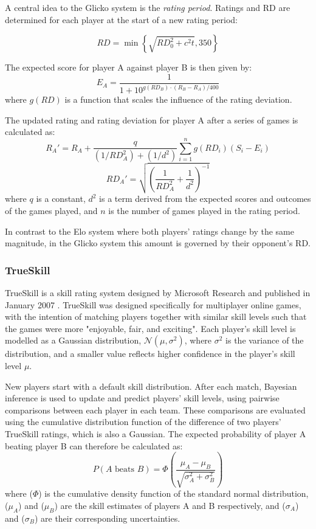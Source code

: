 A central idea to the Glicko system is the \textit{rating period}. Ratings and RD are determined for each player at the start of a new rating period:

\[
RD = \min \left\{ \sqrt{RD_0^2 + c^2t}, 350 \right\}
\]

The expected score for player A against player B is then given by:
\[
E_A = \frac{1}{1 + 10^{g(RD_B) \cdot (R_B - R_A) / 400}}
\]
where \( g(RD) \) is a function that scales the influence of the rating deviation.

The updated rating and rating deviation for player A after a series of games is calculated as:
\[
R_A' = R_A + \frac{q}{(1/RD_A^2) + (1/d^2)} \sum_{i=1}^{n} g(RD_i)(S_i - E_i)
\]
\[
RD_A' = \sqrt{\left(\frac{1}{RD_A^2} + \frac{1}{d^2}\right)^{-1}}
\]
where \( q \) is a constant, \( d^2 \) is a term derived from the expected scores and outcomes of the games played, and \( n \) is the number of games played in the rating period.

In contrast to the Elo system where both players' ratings change by the same magnitude, in the Glicko system this amount is governed by their opponent's RD.

\subsubsection{TrueSkill\texttrademark}

TrueSkill\texttrademark{} is a skill rating system designed by Microsoft Research and published in January 2007 \cite{trueskill}. TrueSkill was designed specifically for multiplayer online games, with the intention of matching players together with similar skill levels such that the games were more "enjoyable, fair, and exciting". Each player's skill level is modelled as a Gaussian distribution, $\mathcal{N}(\mu, \sigma^2)$, where $\sigma^2$ is the variance of the distribution, and a smaller value reflects higher confidence in the player's skill level $\mu$.

New players start with a default skill distribution. After each match, Bayesian inference is used to update and predict players' skill levels, using pairwise comparisons between each player in each team. These comparisons are evaluated using the cumulative distribution function of the difference of two players' TrueSkill ratings, which is also a Gaussian. The expected probability of player A beating player B can therefore be calculated as:
\[P(A \text{ beats } B) = \Phi\left(\frac{\mu_A - \mu_B}{\sqrt{\sigma_A^2 + \sigma_B^2}}\right)\]
where ($\Phi$) is the cumulative density function of the standard normal distribution, ($\mu_A$) and ($\mu_B$) are the skill estimates of players A and B respectively, and ($\sigma_A$) and ($\sigma_B$) are their corresponding uncertainties.

